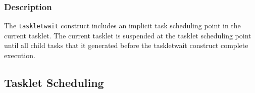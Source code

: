 \subsubsection*{Description}

The \verb|taskletwait| construct includes an implicit task scheduling
point in the current tasklet. The current tasklet is suspended at the
tasklet scheduling point until all child tasks that it generated before
the taskletwait construct complete execution.










%
%

\subsection{Tasklet Scheduling}
\label{115313_4Oct18}



